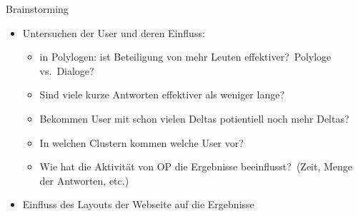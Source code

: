 \documentclass[compress,12pt]{beamer}
\begin{document}
    \begin{frame}{Brainstorming}
        \begin{itemize}
            \item Untersuchen der User und deren Einfluss:
            \begin{itemize}
                \item in Polylogen: ist Beteiligung von mehr Leuten effektiver?\ Polyloge vs.\ Dialoge?
                \item Sind viele kurze Antworten effektiver als weniger lange?
                \item Bekommen User mit schon vielen Deltas potientiell noch mehr Deltas?
                \item In welchen Clustern kommen welche User vor?
                \item Wie hat die Aktivität von OP die Ergebnisse beeinflusst?\ (Zeit, Menge der Antworten, etc.)
            \end{itemize}
            \item Einfluss des Layouts der Webseite auf die Ergebnisse
        \end{itemize}
    \end{frame}
\end{document}

